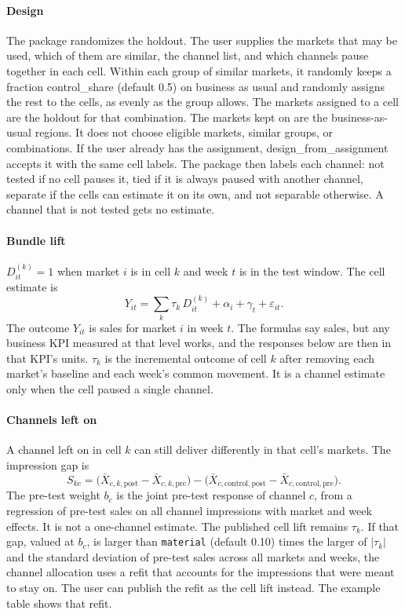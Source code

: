 \documentclass[preprint,12pt]{elsarticle}
\begin{document}
\paragraph{Design}
The package randomizes the holdout. The user supplies the markets that may be used, which of them are similar, the channel list, and which channels pause together in each cell. Within each group of similar markets, it randomly keeps a fraction {\ttfamily control\_\allowbreak share} (default 0.5) on business as usual and randomly assigns the rest to the cells, as evenly as the group allows. The markets assigned to a cell are the holdout for that combination. The markets kept on are the business-as-usual regions. It does not choose eligible markets, similar groups, or combinations. If the user already has the assignment, {\ttfamily design\_\allowbreak from\_\allowbreak assignment} accepts it with the same cell labels. The package then labels each channel: not tested if no cell pauses it, tied if it is always paused with another channel, separate if the cells can estimate it on its own, and not separable otherwise. A channel that is not tested gets no estimate.

\paragraph{Bundle lift}
$D_{it}^{(k)}=1$ when market $i$ is in cell $k$ and week $t$ is in the test window. The cell estimate is
\begin{equation}
\label{eq:cell}
Y_{it} = \sum_{k} \tau_{k}\, D_{it}^{(k)} + \alpha_{i} + \gamma_{t} + \varepsilon_{it}.
\end{equation}
The outcome $Y_{it}$ is sales for market $i$ in week $t$. The formulas say sales, but any business KPI measured at that level works, and the responses below are then in that KPI's units. $\tau_{k}$ is the incremental outcome of cell $k$ after removing each market's baseline and each week's common movement. It is a channel estimate only when the cell paused a single channel.

\paragraph{Channels left on}
A channel left on in cell $k$ can still deliver differently in that cell's markets. The impression gap is
\begin{equation}
\label{eq:shift}
S_{kc} = \big(\bar X_{c,k,\mathrm{post}} - \bar X_{c,k,\mathrm{pre}}\big) - \big(\bar X_{c,\mathrm{control},\mathrm{post}} - \bar X_{c,\mathrm{control},\mathrm{pre}}\big).
\end{equation}
The pre-test weight $b_{c}$ is the joint pre-test response of channel $c$, from a regression of pre-test sales on all channel impressions with market and week effects. It is not a one-channel estimate. The published cell lift remains $\tau_{k}$. If that gap, valued at $b_{c}$, is larger than \texttt{material} (default 0.10) times the larger of $|\tau_{k}|$ and the standard deviation of pre-test sales across all markets and weeks, the channel allocation uses a refit that accounts for the impressions that were meant to stay on. The user can publish the refit as the cell lift instead. The example table shows that refit.
\end{document}
